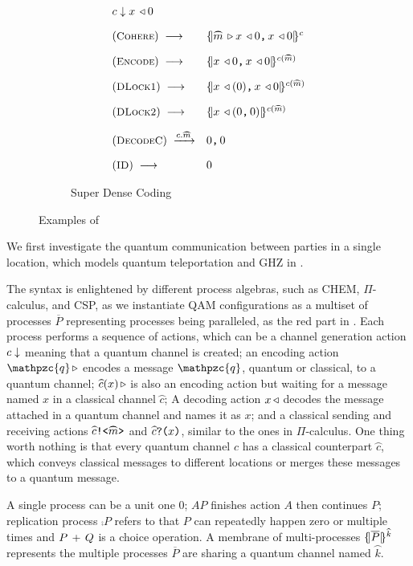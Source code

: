 \begin{figure}[t]
{\begin{subfigure}[t]{0.38\textwidth}
{\[\begin{array}{l}
\begin{array}{ll}
{\down{c}{\decode{x}{0}}
}
\\[1em]
(\rulelab{Cohere})\;
\longrightarrow
&
\pscell{\pard{\encode{\wideparen{m}}\decode{x}{0}}{\decode{x}{0}}}{c}
\\[1em]
(\rulelab{Encode})\;
\longrightarrow
&
\pscell{\pard{\decode{x}{0}}{\decode{x}{0}}}{c(\wideparen{m})}
\\[1em]
(\rulelab{DLock1})\;
\longrightarrow
&
\pscell{\pard{\decode{x}{(0)}}{\decode{x}{0}}}{c(\wideparen{m})}
\\[1em]
(\rulelab{DLock2})\;
\longrightarrow
&
\pscell{\decode{x}{(\pard{0}{0})}}{c(\wideparen{m})}
\\[1em]
(\rulelab{DecodeC})\;
\xrightarrow{c.\wideparen{m}}
&
\pard{{0}}{{0}}
\\[1em]
(\rulelab{ID})\;
\longrightarrow
&
0
\end{array}
\end{array}
\]
}
\caption{Super Dense Coding}
  \label{fig:super-example}
\end{subfigure}
}
\caption{Examples of }
\end{figure}

We first investigate the quantum communication between parties in a single location, which models quantum teleportation and GHZ in .

The syntax is enlightened by different process algebras, such as CHEM, $\Pi$-calculus, and CSP,
as we instantiate QAM configurations as a multiset of processes $\overline{P}$ representing processes being paralleled,
as the red part in .
Each process performs a sequence of actions, which can be
a channel generation action $c\downarrow$ meaning that a quantum channel is created;
an encoding action $\encode{\mathpzc{q}}$ encodes a message $\mathpzc{q}$, quantum or classical, to a quantum channel;
$\encode{\wideparen{c}(x)}$ is also an encoding action but waiting for a message named $x$ in a classical channel $\wideparen{c}$;
A decoding action $x\,\triangleleft$ decodes the message attached in a quantum channel and names it as $x$;
and a classical sending and receiving actions
$\csenda{\wideparen{c}}{\wideparen{m}}$ and $\creva{\wideparen{c}}{x}$, similar to the ones in $\Pi$-calculus.
One thing worth nothing is that every quantum channel $c$ has a classical counterpart $\wideparen{c}$,
which conveys classical messages to different locations or merges these messages to a quantum message.

A single process can be a unit one $0$; $AP$ finishes action $A$ then continues $P$;
replication process $\comp{P}$ refers to that $P$ can repeatedly happen zero or multiple times
and $P\,+\,Q$ is a choice operation.
A membrane of multi-processes $\pscell{\overline{P}}{\wideparen{k}}$ represents the multiple processes $\overline{P}$ are sharing a quantum channel named $\wideparen{k}$.

